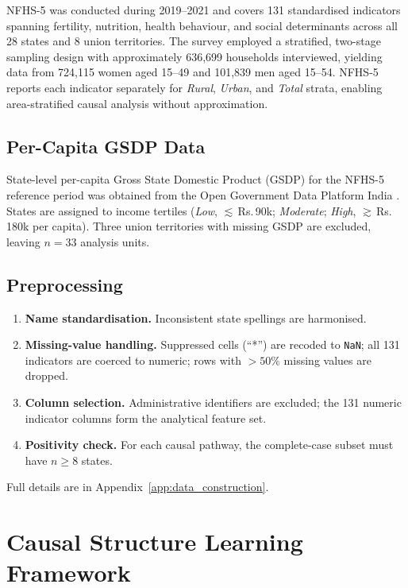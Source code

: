 \documentclass[12pt,a4paper]{report}
\begin{document}
NFHS-5 was conducted during 2019--2021 \citep{nfhs5report} and covers 131
standardised indicators spanning fertility, nutrition, health behaviour, and social
determinants across all 28 states and 8 union territories.
The survey employed a stratified, two-stage sampling design with approximately
636,699 households interviewed, yielding data from 724,115 women aged 15--49 and
101,839 men aged 15--54.
NFHS-5 reports each indicator separately for \emph{Rural}, \emph{Urban}, and
\emph{Total} strata, enabling area-stratified causal analysis without approximation.

\section{Per-Capita GSDP Data}

State-level per-capita Gross State Domestic Product (GSDP) for the NFHS-5
reference period was obtained from the Open Government Data Platform India
\citep{ogd_gsdp_2023}.
States are assigned to income tertiles (\textit{Low}, $\lesssim$\,Rs.\,90k;
\textit{Moderate}; \textit{High}, $\gtrsim$\,Rs.\,180k per capita).
Three union territories with missing GSDP are excluded, leaving $n=33$ analysis
units.

\section{Preprocessing}

\begin{enumerate}[leftmargin=*,itemsep=4pt]
\item \textbf{Name standardisation.} Inconsistent state spellings are harmonised.
\item \textbf{Missing-value handling.} Suppressed cells (``*'') are recoded to
  \texttt{NaN}; all 131 indicators are coerced to numeric; rows with $>50\%$
  missing values are dropped.
\item \textbf{Column selection.} Administrative identifiers are excluded; the 131
  numeric indicator columns form the analytical feature set.
\item \textbf{Positivity check.} For each causal pathway, the complete-case subset
  must have $n\ge8$ states.
\end{enumerate}

Full details are in Appendix~\ref{app:data_construction}.

\chapter{Causal Structure Learning Framework}
\label{chap:framework}
\end{document}
